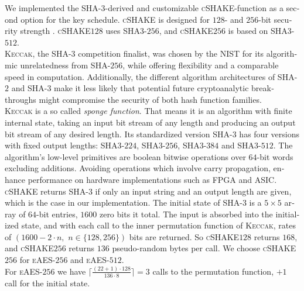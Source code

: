 \documentclass[a4paper,11pt]{article}
\begin{document}
\begin{otherlanguage}{english}
\begin{multicols}{2}

\noindent
We implemented the \textsc{SHA}-$3$-derived and customizable \textsc{cSHAKE}-function as a second option for the key schedule. \textsc{cSHAKE} is designed for $128$- and $256$-bit security strength \cite{SHK}. \textsc{cSHAKE}$128$ uses \textsc{SHA3}-$256$, and \textsc{cSHAKE}$256$ is based on \textsc{SHA3}-$512$.\\

\noindent
\textsc{Keccak}, the \textsc{SHA}-$3$ competition finalist, was chosen by the NIST for its algorithmic unrelatedness from \textsc{SHA}-$256$, while offering flexibility and a comparable speed in computation. Additionally, the different algorithm architectures of \textsc{SHA}-$2$ and \textsc{SHA}-$3$ make it less likely that potential future cryptoanalytic breakthroughs might compromise the security of both hash function families.\\

\noindent
\textsc{Keccak} is a so called \textit{sponge function}. That means it is an algorithm with finite internal state, taking an input bit stream of any length and producing an output bit stream of any desired length. Its standardized version \textsc{SHA}-$3$ has four versions with fixed output lengths: \textsc{SHA3}-$224$, \textsc{SHA3}-$256$, \textsc{SHA3}-$384$ and \textsc{SHA3}-$512$. The algorithm's low-level primitives are boolean bitwise operations over $64$-bit words excluding additions. Avoiding operations which involve carry propagation, enhance performance on hardware implementations such as FPGA and ASIC.\\

\noindent
\textsc{cSHAKE} returns \textsc{SHA}-$3$ if only an input string and an output length are given, which is the case in our implementation. The initial state of \textsc{SHA}-$3$ is a $5 \times 5$ array of $64$-bit entries, $1600$ zero bits it total. The input is absorbed into the initialized state, and with each call to the inner permutation function of \textsc{Keccak}, rates of $(1600 - 2 \cdot n, \,\,  n \in \{ 128, 256 \})$ bits are returned. So \textsc{cSHAKE}$128$ returns $168$, and \textsc{cSHAKE}$256$ returns $136$ pseudo-random bytes per call. We choose \textsc{cSHAKE}$256$ for \textsc{eAES}-$256$ and \textsc{eAES}-$512$.\\

\noindent
For \textsc{eAES}-$256$ we have $\lceil\frac{(22+1) \cdot 128}{136 \cdot 8}\rceil=3$ calls to the permutation function, $+ 1$ call for the initial state.\\


\end{multicols}
\end{otherlanguage}
\end{document}
